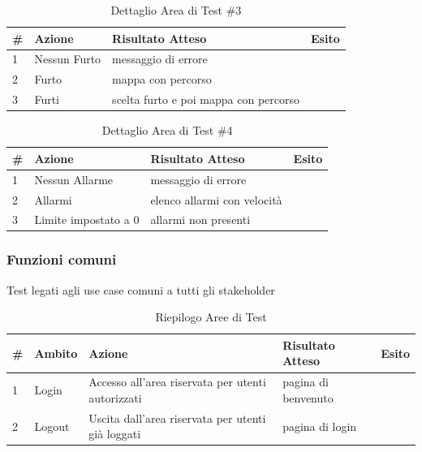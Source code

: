 \documentclass[a4paper,12pt]{article}
\begin{document}
\pagebreak


\begin{table}[ht]
\begin{center}
\caption{Dettaglio Area di Test \#3}
\begin{tabular}{p{0.5cm} p{4cm} p{7.5cm} p{1cm}}
\rowcolor{Ash}
\hline
\# & Azione & Risultato Atteso & Esito \\ \hline
1 & Nessun Furto	&	messaggio di errore		&		\cellcolor{green}{OK}\\
2 & Furto			&	mappa con percorso			&					\cellcolor{green}{OK}\\
3 & Furti			&	scelta furto e poi mappa con percorso	&		\cellcolor{green}{OK}\\ \hline
\end{tabular}
\end{center}
\end{table}


\begin{table}[ht]
\begin{center}
\caption{Dettaglio Area di Test \#4}
\begin{tabular}{p{0.5cm} p{4cm} p{7.5cm} p{1cm}}
\rowcolor{Ash}
\hline
\# & Azione & Risultato Atteso & Esito \\ \hline
1 & Nessun Allarme		&	messaggio di errore			&		\cellcolor{green}{OK}\\
2 & Allarmi				&	elenco allarmi con velocità 	&		\cellcolor{green}{OK}\\
3 & Limite impostato a 0	&	allarmi non presenti		&		\cellcolor{green}{OK}\\ \hline
\end{tabular}
\end{center}
\end{table}

\pagebreak

\subsubsection{Funzioni comuni}
Test legati agli use case comuni a tutti gli stakeholder


\begin{table}[ht]
\begin{center}
\caption{Riepilogo Aree di Test}
\begin{tabular}{p{0.5cm} p{1.5cm} p{6cm} p{3.5cm} p{1cm}}
\rowcolor{Ash}
\hline
\# & Ambito & Azione & Risultato Atteso & Esito \\ \hline
1 &  Login	  &  Accesso all'area riservata per utenti autorizzati	& pagina di benvenuto	&	\cellcolor{green}{OK}\\
2 & Logout &  Uscita dall'area riservata per utenti già  loggati		& pagina di login &	\cellcolor{green}{OK}\\ \hline
\end{tabular}
\end{center}
\end{table}
\end{document}
